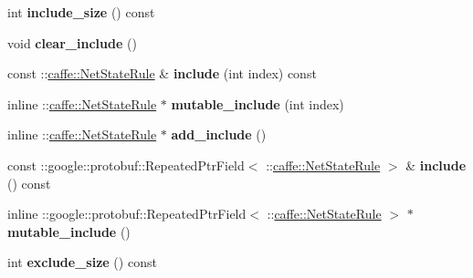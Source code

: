 \begin{DoxyCompactItemize}
\item 
\mbox{\label{classcaffe_1_1_layer_parameter_a6dfe6a95d7c995c498ac09e177d9ae1a}} 
int {\bfseries include\+\_\+size} () const
\item 
\mbox{\label{classcaffe_1_1_layer_parameter_a166f7ea6bac1a8b53854f2a00ca2b99c}} 
void {\bfseries clear\+\_\+include} ()
\item 
\mbox{\label{classcaffe_1_1_layer_parameter_ac07c0349cb041acef7c79765b76f6061}} 
const \+::\mbox{\hyperlink{classcaffe_1_1_net_state_rule}{caffe\+::\+Net\+State\+Rule}} \& {\bfseries include} (int index) const
\item 
\mbox{\label{classcaffe_1_1_layer_parameter_a8672147bce3fe91498055d92f605d379}} 
inline \+::\mbox{\hyperlink{classcaffe_1_1_net_state_rule}{caffe\+::\+Net\+State\+Rule}} $\ast$ {\bfseries mutable\+\_\+include} (int index)
\item 
\mbox{\label{classcaffe_1_1_layer_parameter_ac6d1103bd400b7965e9ef6cff4802b4b}} 
inline \+::\mbox{\hyperlink{classcaffe_1_1_net_state_rule}{caffe\+::\+Net\+State\+Rule}} $\ast$ {\bfseries add\+\_\+include} ()
\item 
\mbox{\label{classcaffe_1_1_layer_parameter_a203ec4d72d4c320dc20f00c8761094ee}} 
const \+::google\+::protobuf\+::\+Repeated\+Ptr\+Field$<$ \+::\mbox{\hyperlink{classcaffe_1_1_net_state_rule}{caffe\+::\+Net\+State\+Rule}} $>$ \& {\bfseries include} () const
\item 
\mbox{\label{classcaffe_1_1_layer_parameter_a514e653ed8edb38aa0cb1b4f37825e8c}} 
inline \+::google\+::protobuf\+::\+Repeated\+Ptr\+Field$<$ \+::\mbox{\hyperlink{classcaffe_1_1_net_state_rule}{caffe\+::\+Net\+State\+Rule}} $>$ $\ast$ {\bfseries mutable\+\_\+include} ()
\item 
\mbox{\label{classcaffe_1_1_layer_parameter_a844d3237d0f9373ef712f6fc131054ac}} 
int {\bfseries exclude\+\_\+size} () const
\item 
\mbox{\label{classcaffe_1_1_layer_parameter_a5ba31fdad541c159bffcb1bdd427c120}} 

\end{DoxyCompactItemize}
